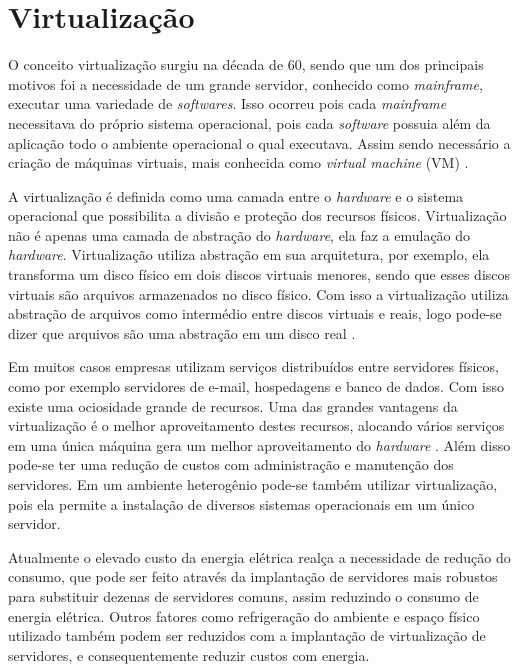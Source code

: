 \chapter{Virtualização}
O conceito virtualização surgiu na década de 60, sendo que um dos principais motivos foi a necessidade de um grande servidor,
conhecido como \textit{mainframe}, executar uma variedade de \textit{softwares}. Isso ocorreu pois cada \textit{mainframe} necessitava
do próprio sistema operacional, pois cada \textit{software} possuia além da aplicação todo o ambiente operacional o qual executava. Assim
sendo necessário a criação de máquinas virtuais, mais conhecida como \textit{virtual machine} (VM) \cite{carissimi2008}.

A virtualização é definida como uma camada entre o \textit{hardware} e o sistema operacional que possibilita a divisão e proteção
dos recursos físicos. Virtualização não é apenas uma camada de abstração do \textit{hardware}, ela faz a emulação do \textit{hardware}.
Virtualização utiliza abstração em sua arquitetura, por exemplo, ela transforma um disco físico em dois discos virtuais menores, 
sendo que esses discos virtuais são arquivos armazenados no disco físico. Com isso a virtualização utiliza abstração de arquivos como 
intermédio entre discos virtuais e reais, logo pode-se dizer que arquivos são uma abstração em um disco real \cite{smithenair2005}. 

Em muitos casos empresas utilizam serviços distribuídos entre servidores físicos, como por exemplo servidores de e-mail, hospedagens e 
banco de dados. Com isso existe uma ociosidade grande de recursos. Uma das grandes vantagens da virtualização é o melhor aproveitamento
destes recursos, alocando vários serviços em uma única máquina gera um melhor aproveitamento do \textit{hardware} \cite{moreira2006}.
Além disso pode-se ter uma redução de custos com administração e manutenção dos servidores. Em um ambiente heterogênio pode-se também
utilizar virtualização, pois ela permite a instalação de diversos sistemas operacionais em um único servidor.

Atualmente o elevado custo da energia elétrica realça a necessidade de redução do consumo, que pode ser feito através da implantação 
de servidores mais robustos para substituir dezenas de servidores comuns, assim reduzindo o consumo de energia elétrica. 
Outros fatores como refrigeração do ambiente e espaço físico utilizado também podem ser reduzidos com a implantação de virtualização de
servidores, e consequentemente reduzir custos com energia.

